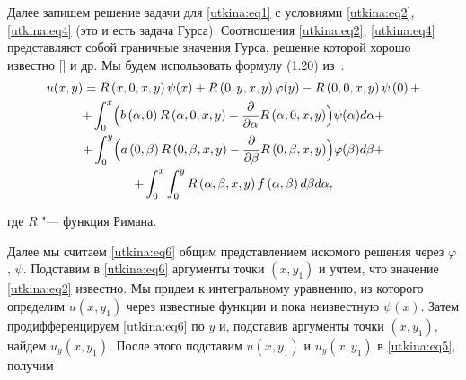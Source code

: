 Далее запишем решение задачи для \eqref{utkina:eq1} с условиями \eqref{utkina:eq2}, \eqref{utkina:eq4} (это и есть задача Гурса). 
Соотношения \eqref{utkina:eq2}, \eqref{utkina:eq4} представляют собой граничные значения Гурса,
решение которой хорошо известно [] и др. 
Мы будем использовать формулу (1.20) из~\cite{utkina:bib:Zhegalov2}:
\begin{multline}
\label{utkina:eq6}
 u(x, y) = R\left( {x, 0,x,y} \right)\psi ( x ) +
R\left( {0,y,x,y} \right)\varphi ( y ) - R\left( {0, 0,x,y}
\right)\psi \left( 0 \right) + \\
 + \int _0^x \Bigl( {b\left( {\alpha , 0} \right)R\left( {\alpha
, 0,x,y} \right) - \frac{\partial }{\partial \alpha }R\left( {\alpha , 0,x,y}
\right)} \Bigr)\psi (\alpha)d\alpha + \\
 + \int _0^y \Bigl( {a\left( {0,\beta } \right)R\left( {0,\beta ,x,y}
\right) - \frac{\partial }{\partial \beta }R\left( {0,\beta ,x,y} \right)}
\Bigr)\varphi (\beta)d\beta + \\
 + \int _0^x \int _0^y R\left( {\alpha ,\beta ,x,y}
\right)f\left( {\alpha ,\beta } \right)d\beta d\alpha , 
\end{multline}

\noindent
где $R$ "--- функция Римана.

Далее мы считаем \eqref{utkina:eq6} общим представлением искомого решения через $\varphi $,
$\psi $. 
Подставим в \eqref{utkina:eq6} аргументы точки $\left( {x,y_1 } \right)$ и учтем,
что значение \eqref{utkina:eq2} известно. 
Мы придем к интегральному уравнению, из которого определим $u(x,y_1 )$ через известные функции и пока неизвестную $\psi (x)$.
Затем продифференцируем \eqref{utkina:eq6} по $y$ и, подставив аргументы точки $\left( {x,y_1
} \right)$, найдем $u_y (x,y_1 )$. 
После этого подставим $u(x,y_1 )$ и $u_y (x,y_1 )$ в \eqref{utkina:eq5}, получим

\vspace{-5mm}

